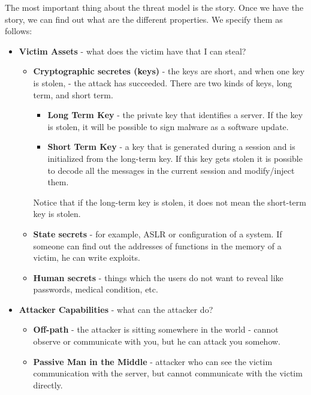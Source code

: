 The most important thing about the threat model is the story. Once we have the story, we can find out what are the different properties. We specify them as follows:

\begin{itemize}
    \item \textbf{Victim Assets} - what does the victim have that I can steal? 
        \begin{itemize}
            \item \textbf{Cryptographic secretes (keys)} -  the keys are short,
            and when one key is stolen, - the attack has succeeded. There are
            two kinds of keys, long term, and short term.
                \begin{itemize}
                    \item \textbf{Long Term Key } - the private key that
                    identifies a server. If the key is stolen, it will be possible
                    to sign malware as a software update.
                    \item \textbf{Short Term Key} - a key that is generated during
                    a session and is initialized from the long-term key. If this key gets stolen  it is possible to decode all the messages in the current session and modify/inject them.
                \end{itemize}
                Notice that if the long-term key is stolen, it does not mean the short-term key is stolen.
            \item \textbf{State secrets} - for example, ASLR or configuration of
            a system. If someone can find out the addresses of functions in the
            memory of a victim, he can write exploits. 
            \item \textbf{Human secrets} - things which the users do not want to
            reveal like passwords, medical condition, etc.
        \end{itemize}
    \item \textbf{Attacker Capabilities} - what can the attacker do?
        \begin{itemize}
            \item \textbf{Off-path} - the attacker is sitting somewhere in the
            world - cannot observe or communicate with you, but he can attack you
            somehow. 
            \item \textbf{Passive Man in the Middle} - attacker who can see the
            victim communication with the server, but cannot communicate with the victim directly.

\end{itemize}
\end{itemize}
